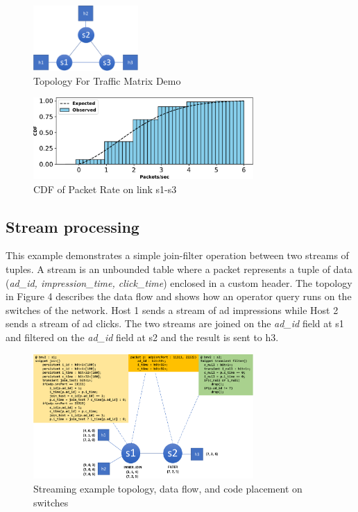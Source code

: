 \begin{figure}[tp]
\centering
\includegraphics[width=40mm,scale=0.7]{figures/traf_mat_topo}
\caption{Topology For Traffic Matrix Demo}
\end{figure}

 \vspace{-4mm}

\begin{figure}[tp]
\centering
\includegraphics[width=84mm,scale=0.7]{figures/exp_obs_cdf}
\caption{CDF of Packet Rate on link s1-s3}
\end{figure}

 \vspace{1mm}
\subsection{Stream processing}
 \vspace{-1mm}

This example demonstrates a simple join-filter operation between two streams of
tuples. A stream is an unbounded table where a packet represents a tuple of
data (\textit{ad\_id, impression\_time, click\_time}) enclosed in a custom
header. The topology in Figure 4 describes the data flow and shows how an
operator query runs on the switches of the network. Host 1 sends a stream of ad
impressions while Host 2 sends a stream of ad clicks. The two streams are
joined on the \textit{ad\_id} field at s1 and filtered on the \textit{ad\_id}
field at s2 and the result is sent to h3. 

\begin{figure}[tp]
\centering
\includegraphics[width=84mm]{figures/streaming_example}
\caption{Streaming example topology, data flow, and code placement on switches}
\vspace{-5mm}
\end{figure}
\vspace{-3mm}


